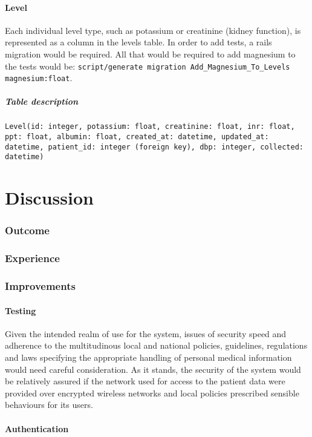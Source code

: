 \documentclass[letterpaper]{amsart}
\begin{document}
\subsection{Level}
Each individual level type, such as potassium or creatinine (kidney function), is represented as a column in the levels table.  In order to add tests, a rails migration would be required.  All that would be required to add magnesium to the tests would be: \texttt{script/generate migration Add\_Magnesium\_To\_Levels magnesium:float}.
\subsubsection{Table description}
\texttt{Level(id: integer, potassium: float, creatinine: float, inr: float, ppt: float, albumin: float, created\_at: datetime, updated\_at: datetime, patient\_id: integer (foreign key), dbp: integer, collected: datetime)}

\part{Discussion}
\section{Outcome}
\section{Experience}
\section{Improvements}
\subsection{Testing} 
Given the intended realm of use for the system, issues of security speed and adherence to the multitudinous local and national policies, guidelines, regulations and laws specifying the appropriate handling of personal medical information would need careful consideration.  As it stands, the security of the system would be relatively assured if the network used for access to the patient data were provided over encrypted wireless networks and local policies prescribed sensible behaviours for its users.
\subsection{Authentication}
\end{document}
